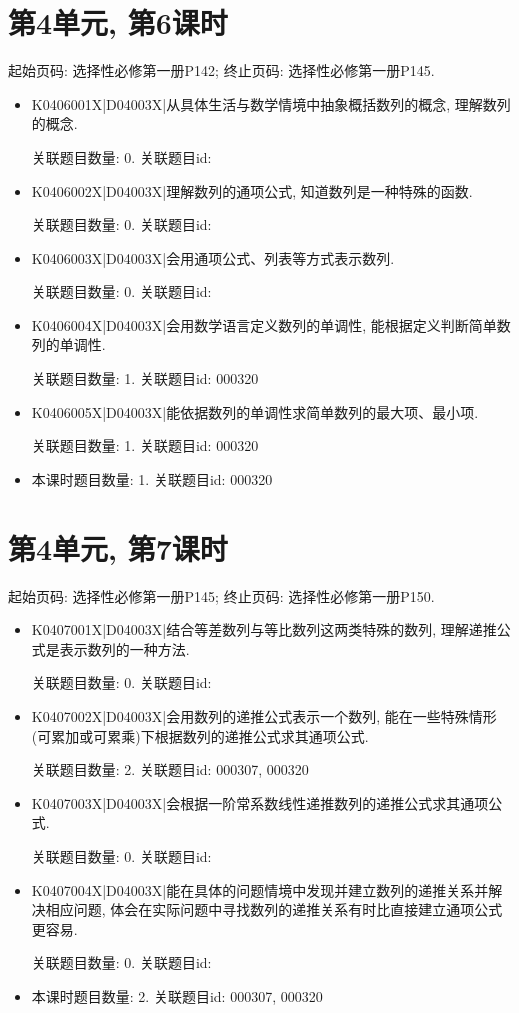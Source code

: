 \section*{第4单元, 第6课时}
起始页码: 选择性必修第一册P142; 终止页码: 选择性必修第一册P145.
\begin{itemize}
\item K0406001X|D04003X|从具体生活与数学情境中抽象概括数列的概念, 理解数列的概念.

关联题目数量: 0. 关联题目id: 

\item K0406002X|D04003X|理解数列的通项公式, 知道数列是一种特殊的函数.

关联题目数量: 0. 关联题目id: 

\item K0406003X|D04003X|会用通项公式、列表等方式表示数列.

关联题目数量: 0. 关联题目id: 

\item K0406004X|D04003X|会用数学语言定义数列的单调性, 能根据定义判断简单数列的单调性.

关联题目数量: 1. 关联题目id: 000320

\item K0406005X|D04003X|能依据数列的单调性求简单数列的最大项、最小项.

关联题目数量: 1. 关联题目id: 000320

\item 本课时题目数量: 1. 关联题目id: 000320

\end{itemize}

\section*{第4单元, 第7课时}
起始页码: 选择性必修第一册P145; 终止页码: 选择性必修第一册P150.
\begin{itemize}
\item K0407001X|D04003X|结合等差数列与等比数列这两类特殊的数列, 理解递推公式是表示数列的一种方法.

关联题目数量: 0. 关联题目id: 

\item K0407002X|D04003X|会用数列的递推公式表示一个数列, 能在一些特殊情形(可累加或可累乘)下根据数列的递推公式求其通项公式.

关联题目数量: 2. 关联题目id: 000307, 000320

\item K0407003X|D04003X|会根据一阶常系数线性递推数列的递推公式求其通项公式.

关联题目数量: 0. 关联题目id: 

\item K0407004X|D04003X|能在具体的问题情境中发现并建立数列的递推关系并解决相应问题, 体会在实际问题中寻找数列的递推关系有时比直接建立通项公式更容易.

关联题目数量: 0. 关联题目id: 

\item 本课时题目数量: 2. 关联题目id: 000307, 000320

\end{itemize}


